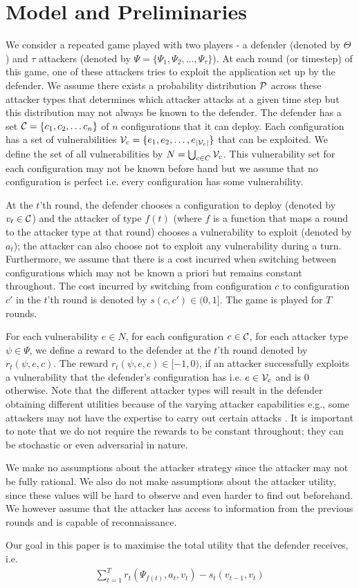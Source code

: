 \section{Model and Preliminaries}\label{sec:model}
We consider a repeated game played with two players - a defender (denoted by $\Theta$) and $\tau$ attackers (denoted by $ \Psi = \{\Psi_1, \Psi_2, \dots, \Psi_\tau\}$). At each round (or timestep) of this game, one of these attackers tries to exploit the application set up by the defender. We assume there exists a probability distribution $\cal P$ across these attacker types that determines which attacker attacks at a given time step but this distribution may not always be known to the defender. The defender has a set $\cal C = \{c_1, c_2, \dots c_n\}$ of $n$ configurations that it can deploy. Each configuration has a set of vulnerabilities $\cal V_c = \{e_1, e_2, \dots, e_{|\cal V_c|}\}$ that can be exploited. We define the set of all vulnerabilities by  $N = \bigcup_{c \in C} \cal V_c$. This vulnerability set for each configuration may not be known before hand but we assume that no configuration is perfect i.e. every configuration has some vulnerability. 

At the $t$'th round, the defender chooses a configuration to deploy (denoted by $v_t \in \cal C$) and the attacker of type $f(t)$ (where $f$ is a function that maps a round to the attacker type at that round) chooses a vulnerability to exploit (denoted by $a_t$); the attacker can also choose not to exploit any vulnerability during a turn. Furthermore, we assume that there is a cost incurred when switching between configurations which may not be known a priori but remains constant throughout. The cost incurred by switching from configuration $c$ to configuration $c'$ in the $t$'th round is denoted by $s(c, c') \in (0,1]$. The game is played for $T$ rounds. 

For each vulnerability $e \in N$, for each configuration $c \in \cal C$, for each attacker type $\psi \in \Psi$, we define a reward to the defender at the $t$'th round denoted by $r_t(\psi, e, c)$. The reward $r_t(\psi, e, c) \in [-1, 0)$, if an attacker successfully exploits a vulnerability that the defender's configuration has i.e. $e \in \cal V_c$ and is $0$ otherwise. Note that the different attacker types will result in the defender obtaining different utilities because of the varying attacker capabilities e.g., some attackers may not have the expertise to carry out certain attacks \citep{sailik2016webappmtd}. It is important to note that we do not require the rewards to be constant throughout; they can be stochastic or even adversarial in nature.

We make no assumptions about the attacker strategy since the attacker may not be fully rational. We also do not make assumptions about the attacker utility, since these values will be hard to observe and even harder to find out beforehand. We however assume that the attacker has access to information from the previous rounds and is capable of reconnaissance.

Our goal in this paper is to maximise the total utility that the defender receives, i.e.
\begin{align*}
    \sum_{t=1}^T r_t(\Psi_{f(t)}, a_t, v_t) - s_t(v_{t-1}, v_t)
\end{align*}